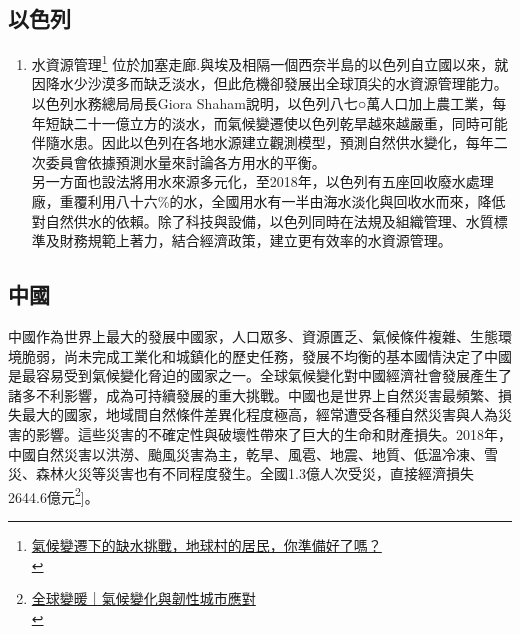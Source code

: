 \documentclass[a4paper,12pt]{article}
\begin{document}
\subsection{以色列}
\label{sec:org9da2706}
\begin{enumerate}
\item 水資源管理\footnote{\href{https://www.cw.com.tw/article/5090081?from=search}{氣候變遷下的缺水挑戰，地球村的居民，你準備好了嗎？}\\\label{org1964228}}
\label{sec:org80010bc}
位於加塞走廊.與埃及相隔一個西奈半島的以色列自立國以來，就因降水少沙漠多而缺乏淡水，但此危機卻發展出全球頂尖的水資源管理能力。以色列水務總局局長Giora Shaham說明，以色列八七○萬人口加上農工業，每年短缺二十一億立方的淡水，而氣候變遷使以色列乾旱越來越嚴重，同時可能伴隨水患。因此以色列在各地水源建立觀測模型，預測自然供水變化，每年二次委員會依據預測水量來討論各方用水的平衡。\\

另一方面也設法將用水來源多元化，至2018年，以色列有五座回收廢水處理廠，重覆利用八十六\%的水，全國用水有一半由海水淡化與回收水而來，降低對自然供水的依賴。除了科技與設備，以色列同時在法規及組織管理、水質標準及財務規範上著力，結合經濟政策，建立更有效率的水資源管理。\\
\end{enumerate}

\subsection{中國}
\label{sec:org1f6e5f0}
中國作為世界上最大的發展中國家，人口眾多、資源匱乏、氣候條件複雜、生態環境脆弱，尚未完成工業化和城鎮化的歷史任務，發展不均衡的基本國情決定了中國是最容易受到氣候變化脅迫的國家之一。全球氣候變化對中國經濟社會發展產生了諸多不利影響，成為可持續發展的重大挑戰。中國也是世界上自然災害最頻繁、損失最大的國家，地域間自然條件差異化程度極高，經常遭受各種自然災害與人為災害的影響。這些災害的不確定性與破壞性帶來了巨大的生命和財產損失。2018年，中國自然災害以洪澇、颱風災害為主，乾旱、風雹、地震、地質、低溫冷凍、雪災、森林火災等災害也有不同程度發生。全國1.3億人次受災，直接經濟損失2644.6億元\footnote{\href{http://m.tanpaifang.com/article/72587.html}{全球變暖｜氣候變化與韌性城市應對}\\\label{orgcd53ba7}}]。\\
\end{document}
